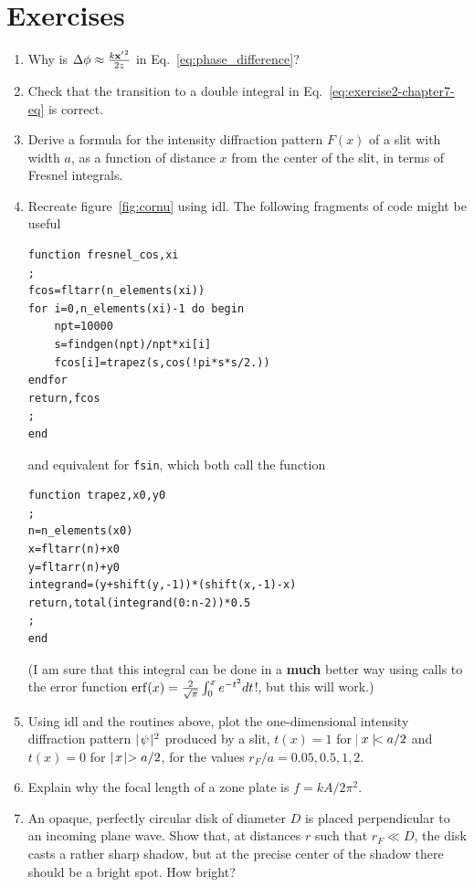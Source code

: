 \section{Exercises}
\begin{enumerate}[labelindent=\parindent, align=left, leftmargin=!,
		series = questions]
	\item Why is $\Delta\phi\approx {k{\bf x'}^2\over 2z}$ in Eq.~\ref{eq:phase_difference}?
	\item Check that the transition to a double integral in Eq.~\ref{eq:exercise2-chapter7-eq}
		is correct.
	\item Derive a formula for the intensity diffraction pattern $F(x)$ of a slit with width
		$a$, as a
		function of distance $x$ from the center of the slit, in terms of Fresnel integrals. 
	\item Recreate figure~\ref{fig:cornu} using {\sc idl}. The following fragments of code might 
		be useful
\belowcaptionskip=-10pt
\begin{lstlisting}[caption=Useful code I]
function fresnel_cos,xi
;
fcos=fltarr(n_elements(xi))
for i=0,n_elements(xi)-1 do begin
	npt=10000
	s=findgen(npt)/npt*xi[i]
	fcos[i]=trapez(s,cos(!pi*s*s/2.))
endfor
return,fcos
;
end
\end{lstlisting}
and equivalent for {\tt fsin}, which both call the function
\belowcaptionskip=-10pt
\begin{lstlisting}[caption=Useful code II]
function trapez,x0,y0
;
n=n_elements(x0)
x=fltarr(n)+x0
y=fltarr(n)+y0
integrand=(y+shift(y,-1))*(shift(x,-1)-x)
return,total(integrand(0:n-2))*0.5
;
end
\end{lstlisting}
(I am sure that this integral can be done in a {\bf much} better way
using calls to the error function ${\rm
  erf}(x)={2\over\sqrt{\pi}}\int_0^xe^{-t^2}dt$!, but this will work.)
\item Using {\sc idl}  and the routines above, plot the one-dimensional intensity diffraction pattern
  $\mid\!\psi\!\mid^2$ produced by a slit, $t(x)=1$ for $\!\mid x\mid\!<
  {a/2}$ and $t(x)=0$ for $\mid\! x\!\mid > {a/2}$, for the values
  ${r_F/a}=0.05, 0.5, 1, 2$.
\item Explain why the focal length of a zone plate is $f={kA/2\pi^2}$. 
\item An opaque, perfectly circular disk of diameter $D$ is placed perpendicular
	to an incoming plane wave. Show that, at distances $r$ such that $r_F\ll D$, the
	disk casts a rather sharp shadow, but at the precise center of the shadow there
	should be a bright spot. How bright?
\end{enumerate}
